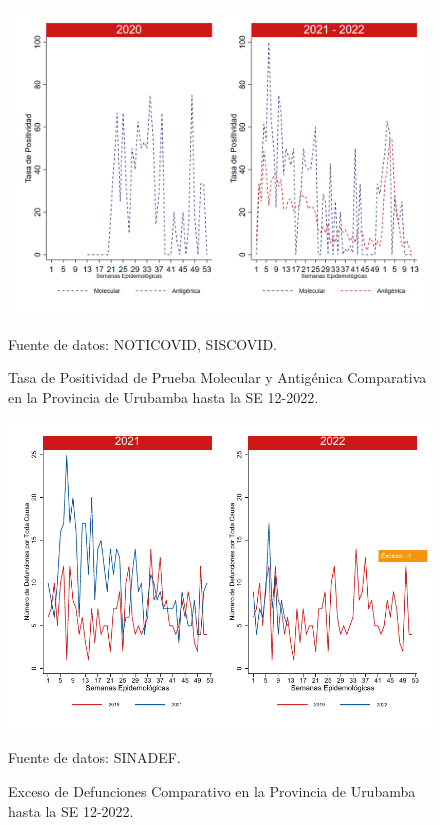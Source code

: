 \documentclass[12pt,a4paper,openany]{book}
\begin{document}
		\begin{figure}[h]
			\caption{Tasa de Positividad de Prueba Molecular y Antigénica Comparativa en la Provincia de Urubamba hasta la SE 12-2022.}\label{fig:positividad_urub}
			\begin{center}
				\includegraphics[width=0.7\linewidth]{../figuras/positividad_20_21_13.png}
			\end{center}
			{\footnotesize {Fuente de datos: NOTICOVID, SISCOVID.}}
		\end{figure}
		
		\begin{figure}[h]
			\caption{Exceso de Defunciones Comparativo en la Provincia de Urubamba hasta la SE 12-2022.}\label{fig:exceso_urub}
			\begin{center}
				\includegraphics[width=0.7\linewidth]{../figuras/exceso_13.pdf}
			\end{center}
			{\footnotesize {Fuente de datos: SINADEF.}}
		\end{figure}
		
		\clearpage
		
		\clearpage
		
\end{document}

